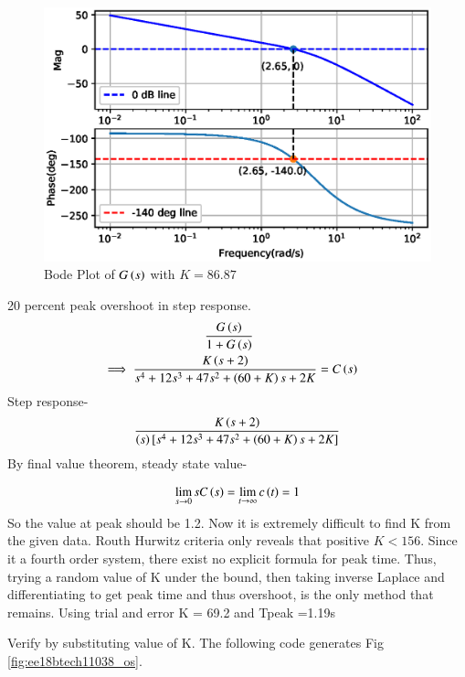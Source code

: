 \begin{figure}[!h]
\centering
\includegraphics[width=\columnwidth]{./figs/ee18btech11038_verb.eps}
\caption{Bode Plot of $G\left(s\right)$ with $K= 86.87$}
\label{fig:ee18btech11038_verb}
\end{figure}

20 percent peak overshoot in step response.
\begin{align}
    \frac{G\left(s\right)}{1+G\left(s\right)} \quad \quad \quad\quad\quad
    \\
    \implies \frac{K\left(s+2\right)}{s^4 + 12s^3 + 47s^2 + \left(60+K\right)s + 2K} &= C\left(s\right)
\end{align}
Step response-
\begin{align}
    \frac{K\left(s+2\right)}{\left(s\right)[s^4 + 12s^3 + 47s^2 + \left(60+K\right)s + 2K]}
\end{align}
By final value theorem, steady state value-

\begin{align}
    \lim_{s \to 0} sC\left(s\right) = \lim_{t \to \infty} c\left(t\right) = 1
\end{align}
So the value at peak should be 1.2.
Now it is extremely difficult to find K  from the given data. Routh Hurwitz criteria only reveals that positive $K<156$.
Since it a fourth order system, there exist no explicit formula for peak time. Thus, trying a random value of K under the bound, then taking inverse Laplace and differentiating to get peak time and thus overshoot, is the only method that remains. Using trial and error K = 69.2 and Tpeak =1.19s

Verify by substituting value of K. 
The following code generates Fig \ref{fig:ee18btech11038_os}.

